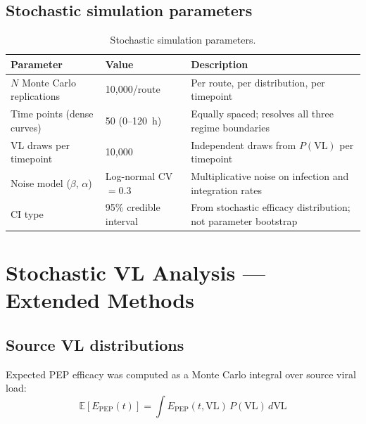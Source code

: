 \documentclass[11pt]{article}
\theoremstyle{definition}
\theoremstyle{remark}
\newcommand{\Epep}{E_{\text{PEP}}}
\begin{document}
\subsection{Stochastic simulation parameters}

\begin{table}[H]
\centering
\small
\caption{Stochastic simulation parameters.}
\begin{tabular}{@{}lll@{}}
\toprule
\textbf{Parameter} & \textbf{Value} & \textbf{Description} \\
\midrule
$N$ Monte Carlo replications & 10{,}000/route & Per route, per distribution, per timepoint \\
Time points (dense curves) & 50 (0--120~h) & Equally spaced; resolves all three regime boundaries \\
VL draws per timepoint & 10{,}000 & Independent draws from $P(\text{VL})$ per timepoint \\
Noise model ($\beta$, $\alpha$) & Log-normal CV $= 0.3$ & Multiplicative noise on infection and integration rates \\
CI type & 95\% credible interval & From stochastic efficacy distribution; not parameter bootstrap \\
\bottomrule
\end{tabular}
\end{table}

\section{Stochastic VL Analysis --- Extended Methods}

\subsection{Source VL distributions}

Expected PEP efficacy was computed as a Monte Carlo integral over source viral load:
\begin{equation}
\mathbb{E}[\Epep(t)] = \int \Epep(t, \text{VL})\,P(\text{VL})\,d\text{VL}
\label{eq:mc_integral}
\end{equation}
\end{document}
